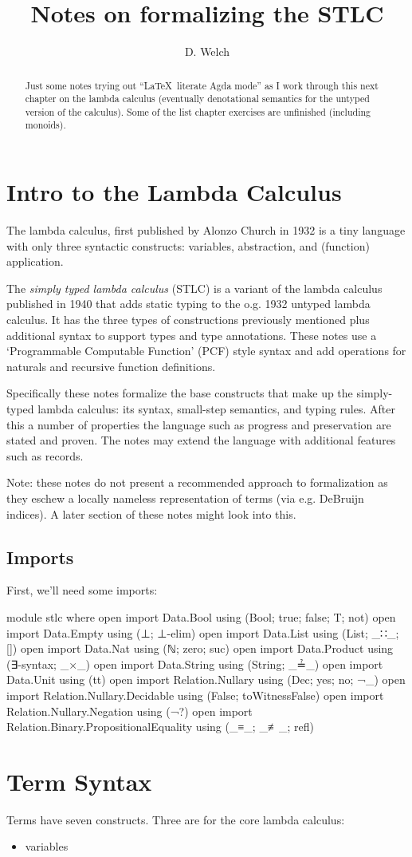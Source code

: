 \documentclass[runningheads]{llncs}
\begin{document}
\title{Notes on formalizing the STLC}
\author{D. Welch}
\institute{}
\maketitle

\begin{abstract}
Just some notes trying out ``\LaTeX \ literate Agda mode'' as I work through 
this next chapter on the lambda calculus (eventually denotational semantics for
the untyped version of the calculus). Some of the list chapter exercises are
unfinished (including monoids).
\end{abstract}

\section{Intro to the Lambda Calculus} 

The lambda calculus, first published by Alonzo Church in 1932 is a tiny language 
with only three syntactic constructs: variables, abstraction, and (function) 
application. 

The \textit{simply typed lambda calculus} (STLC) is a variant of the lambda 
calculus published in 1940 that adds static typing to the o.g. 1932 untyped 
lambda calculus. It has the three types of constructions previously mentioned 
plus additional syntax to support types and type annotations. These notes use a 
`Programmable Computable Function' (PCF) style syntax and add operations for 
naturals and recursive function definitions.

Specifically these notes formalize the base constructs that make up the 
simply-typed lambda calculus: its syntax, small-step semantics, and typing 
rules. After this a number of properties the language such as progress and 
preservation are stated and proven. The notes may extend the language with 
additional features such as records.

Note: these notes do not present a recommended approach to formalization as 
they eschew a locally nameless representation of terms (via e.g. DeBruijn 
indices). A later section of these notes might look into this. 

\subsection{Imports}

First, we'll need some imports:
\begin{code}
module stlc where 
open import Data.Bool using (Bool; true; false; T; not)
open import Data.Empty using (⊥; ⊥-elim)
open import Data.List using (List; _∷_; [])
open import Data.Nat using (ℕ; zero; suc)
open import Data.Product using (∃-syntax; _×_)
open import Data.String using (String; _≟_)
open import Data.Unit using (tt)
open import Relation.Nullary using (Dec; yes; no; ¬_)
open import Relation.Nullary.Decidable using (False; toWitnessFalse)
open import Relation.Nullary.Negation using (¬?)
open import Relation.Binary.PropositionalEquality using (_≡_; _≢_; refl)
\end{code}

\section{Term Syntax}

Terms have seven constructs. Three are for the core lambda calculus:
\begin{itemize}
\item variables 
\end{itemize}
\end{document}
